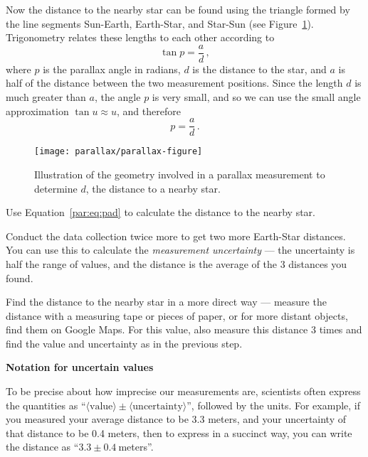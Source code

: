Now the distance to the nearby star can be found using the triangle formed by the line segments Sun-Earth, Earth-Star, and Star-Sun (see Figure~\ref{par:fig:figure}). Trigonometry relates these lengths to each other according to
\begin{equation}
	\tan p = \frac{a}{d}\,,
\end{equation}
where $p$ is the parallax angle in radians, $d$ is the distance to the star, and $a$ is half of the distance between the two measurement positions. Since the length $d$ is much greater than $a$, the angle $p$ is very small, and so we can use the small angle approximation $\tan u \approx u$, and therefore
\begin{equation}\label{par:eq:pad}
	p = \frac{a}{d}\,.
\end{equation}

\begin{figure}
	\texttt{[image: parallax/parallax-figure]}
	\caption{Illustration of the geometry involved in a parallax measurement to determine $d$, the distance to a nearby star.}\label{par:fig:figure}
\end{figure}

\begin{steps}
	\item Use Equation\ \ref{par:eq:pad} to calculate the distance to the nearby star.
	
	\item Conduct the data collection twice more to get two more Earth-Star distances. You can use this to calculate the \textit{measurement uncertainty} --- the uncertainty is half the range of values, and the distance is the average of the 3 distances you found.
	
	\item Find the distance to the nearby star in a more direct way --- measure the distance with a measuring tape or pieces of paper, or for more distant objects, find them on Google Maps.
	For this value, also measure this distance 3 times and find the value and uncertainty as in the previous step.
\end{steps}

\begin{framed}
	\textbf{Notation for uncertain values}
	
To be precise about how imprecise our measurements are, scientists often express the quantities as ``$\langle \textrm{value} \rangle \pm \langle \textrm{uncertainty} \rangle$'', followed by the units. For example, if you measured your average distance to be 3.3 meters, and your uncertainty of that distance to be 0.4 meters, then to express in a succinct way, you can write the distance as ``$3.3 \pm 0.4\:$meters''.
\end{framed}

